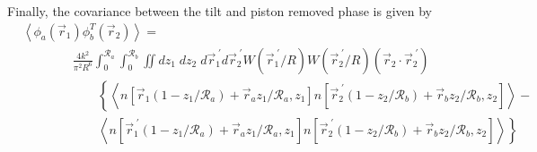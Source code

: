 Finally, the covariance between the tilt and piston removed phase is given by 
\begin{equation}\label{eqn:tprphase_n}
\begin{aligned}
&\left\langle \phi_{a}\left(\vec{r}_{1}\right) \phi^{T}_{b}\left(\vec{r}_{2}\right)\right\rangle = \\
&\quad\quad\quad\quad
\frac{4 k^{2}}{\pi^{2}R^{6}} \int_{0}^{\mathcal{R}_{a}}  \int_{0}^{\mathcal{R}_{b}} \iint dz_{1} \; dz_{2} \; d\vec{r}^{\;\prime}_{1}d\vec{r}^{\;\prime}_{2} W(\vec{r}^{\;\prime}_{1}/R) W(\vec{r}^{\;\prime}_{2}/R)
\left(\vec{r}_{2} \cdot \vec{r}^{\;\prime}_{2}\right)
\\
&\quad\quad\quad\quad\quad\quad
\left\{
\left\langle n\left[\vec{r}_{1}\left(1-z_{1}/\mathcal{R}_{a}\right) + \vec{r}_{a} z_{1}/\mathcal{R}_{a}, z_{1}\right]
 n\left[\vec{r}^{\;\prime}_{2}\left(1-z_{2}/\mathcal{R}_{b}\right) + \vec{r}_{b} z_{2}/\mathcal{R}_{b}, z_{2}\right] \right\rangle - 
\right.
\\
&\quad\quad\quad\quad\quad\quad
\left.
\left\langle n\left[\vec{r}^{\;\prime}_{1}\left(1-z_{1}/\mathcal{R}_{a}\right) + \vec{r}_{a} z_{1}/\mathcal{R}_{a}, z_{1}\right]
 n\left[\vec{r}^{\;\prime}_{2}\left(1-z_{2}/\mathcal{R}_{b}\right) + \vec{r}_{b} z_{2}/\mathcal{R}_{b}, z_{2}\right] \right\rangle
\right\}
\end{aligned}
\end{equation}


